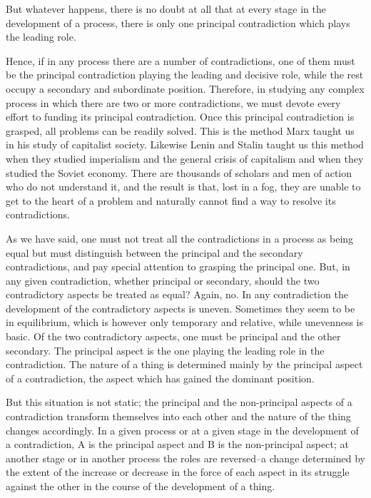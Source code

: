 \documentclass{article}
\begin{document}
But whatever happens, there is no doubt at all that at every stage in the
development of a process, there is only one principal contradiction which plays
the leading role.

Hence, if in any process there are a number of contradictions, one of them must
be the principal contradiction playing the leading and decisive role, while the
rest occupy a secondary and subordinate position. Therefore, in studying any
complex process in which there are two or more contradictions, we must devote
every effort to funding its principal contradiction. Once this principal
contradiction is grasped, all problems can be readily solved. This is the
method Marx taught us in his study of capitalist society. Likewise Lenin and
Stalin taught us this method when they studied imperialism and the general
crisis of capitalism and when they studied the Soviet economy. There are
thousands of scholars and men of action who do not understand it, and the
result is that, lost in a fog, they are unable to get to the heart of a problem
and naturally cannot find a way to resolve its contradictions.

As we have said, one must not treat all the contradictions in a process as
being equal but must distinguish between the principal and the secondary
contradictions, and pay special attention to grasping the principal one. But,
in any given contradiction, whether principal or secondary, should the two
contradictory aspects be treated as equal? Again, no. In any contradiction the
development of the contradictory aspects is uneven. Sometimes they seem to be
in equilibrium, which is however only temporary and relative, while unevenness
is basic. Of the two contradictory aspects, one must be principal and the other
secondary. The principal aspect is the one playing the leading role in the
contradiction. The nature of a thing is determined mainly by the principal
aspect of a contradiction, the aspect which has gained the dominant position.

But this situation is not static; the principal and the non-principal aspects
of a contradiction transform themselves into each other and the nature of the
thing changes accordingly. In a given process or at a given stage in the
development of a contradiction, A is the principal aspect and B is the
non-principal aspect; at another stage or in another process the roles are
reversed--a change determined by the extent of the increase or decrease in the
force of each aspect in its struggle against the other in the course of the
development of a thing.
\end{document}
